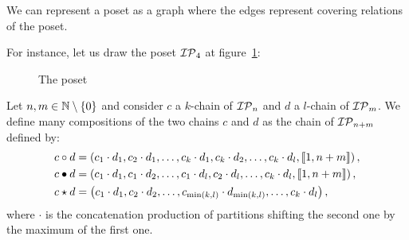 We can represent a poset as a graph where the edges represent covering relations of the poset.
\begin{Eg}
	For instance, let us draw the poset $\mathcal{IP}_{4}$ at figure~\ref{fig:IP4}:
	\begin{figure}[h]
		\centering
		\caption{The  poset}
		\label{fig:IP4}
	\end{figure}
\end{Eg}
\begin{defi}\label{defi:products of chains}
	Let $n,m\in\mathbb{N}\setminus\{0\}$ and consider $c$ a $k$-chain of $\mathcal{IP}_{n}$ and $d$ a $l$-chain of $\mathcal{IP}_{m}$.
	We define many compositions of the two chains $c$ and $d$ as the chain of $\mathcal{IP}_{n+m}$ defined by:
	\begin{align*}
		c\circ d&=\left( c_1\cdot d_1,c_2\cdot d_1,\dots, c_k\cdot d_1,c_k\cdot d_2,\dots,c_k\cdot d_l, \llbracket 1,n+m \rrbracket\right), \\
		c\bullet d&=\left( c_1\cdot d_1,c_1\cdot d_2,\dots, c_1\cdot d_l,c_2\cdot d_l,\dots,c_k\cdot d_l, \llbracket 1,n+m \rrbracket\right), \\
		c\star d&=\left( c_1\cdot d_1,c_2\cdot d_2,\dots, c_{\min(k,l)}\cdot d_{\min(k,l)}, \dots,c_k\cdot d_l \right),
	\end{align*}
	where $\cdot$ is the concatenation production of partitions shifting the second one by the maximum of the first one.
\end{defi}

